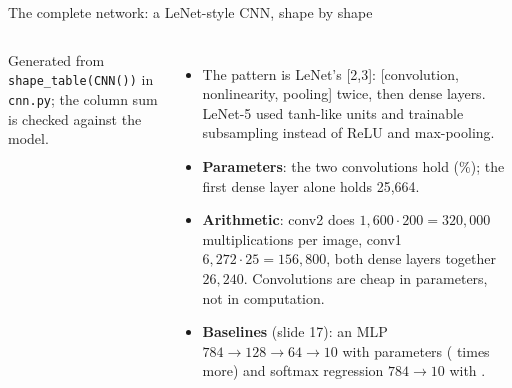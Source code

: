 \documentclass[aspectratio=169,10pt]{beamer}
\renewcommand{\cite}[1]{{\scriptsize\color{cTok}[#1]}}
\begin{document}
\begin{frame}{The complete network: a LeNet-style CNN, shape by shape}
\begin{columns}[T,onlytextwidth]
\vspace{0.5mm}
{\scriptsize\color{cTok}Generated from \texttt{shape\_table(CNN())} in \texttt{cnn.py}; the column sum is checked against the model.}
\footnotesize
\begin{itemize}
  \item The pattern is LeNet's \cite{2,3}: [convolution, nonlinearity, pooling] twice, then dense layers.
        LeNet-5 used tanh-like units and trainable subsampling instead of ReLU and max-pooling.
  \item \textbf{Parameters}: the two convolutions hold \paramsConv{} (\paramsConvShare\%); the first
        dense layer alone holds 25{,}664.
  \item \textbf{Arithmetic}: conv2 does $1{,}600\cdot200=320{,}000$ multiplications per image,
        conv1 $6{,}272\cdot25=156{,}800$, both dense layers together $26{,}240$. Convolutions are cheap in
        parameters, not in computation.
  \item \textbf{Baselines} (slide 17): an MLP $784\to128\to64\to10$ with \paramsMlp{} parameters
        (\paramRatio{} times more) and softmax regression $784\to10$ with \paramsLin.
\end{itemize}
\end{columns}
\end{frame}
\end{document}
